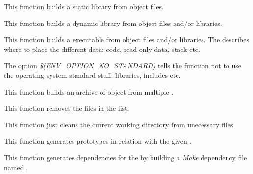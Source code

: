          {
	   This function builds a static library from object files.
	 }

         {
	   This function builds a dynamic library from object files and/or
	   libraries.
	 }

         {
	   This function builds a executable from object files and/or
	   libraries. The  describes where to
	   place the different data: code, read-only data, stack etc.

	   \-

	   The option \textit{\$(ENV\_OPTION\_NO\_STANDARD)} tells the function
	   not to use the operating system standard stuff: libraries, includes
	   etc.
	 }

         {
	   This function builds an archive of object from multiple
	   .
	 }

         {
	   This function removes the files in the list.
	 }

         {
	   This function just cleans the current working directory from
	   unecessary files.
	 }

         {
	   This function generates prototypes in relation with the given
	   .
	 }

         {
	   This function generates dependencies for the 
	   by building a \textit{Make} dependency file named .
	 }

